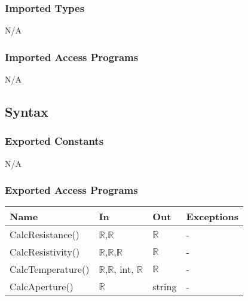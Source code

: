 \documentclass[12pt, titlepage]{article}
\begin{document}
\subsubsection{Imported Types}
N/A


\subsubsection{Imported Access Programs}
N/A

\subsection{Syntax}

\subsubsection{Exported Constants}
N/A

\subsubsection{Exported Access Programs}

\begin{center}
\begin{tabular}{p{4cm} p{5cm} p{3cm} p{2cm}}
\hline
\textbf{Name} & \textbf{In} & \textbf{Out} & \textbf{Exceptions} \\
\hline
CalcResistance() & $\mathbb{R}$,$\mathbb{R}$ & $\mathbb{R}$ & - \\
CalcResistivity() & $\mathbb{R}$,$\mathbb{R}$,$\mathbb{R}$ & $\mathbb{R}$ & - \\
CalcTemperature() & $\mathbb{R}$,$\mathbb{R}$, int, $\mathbb{R}$ & $\mathbb{R}$ & - \\
CalcAperture() & $\mathbb{R}$ & string & - \\
\hline
\end{tabular}
\end{center}
\end{document}
